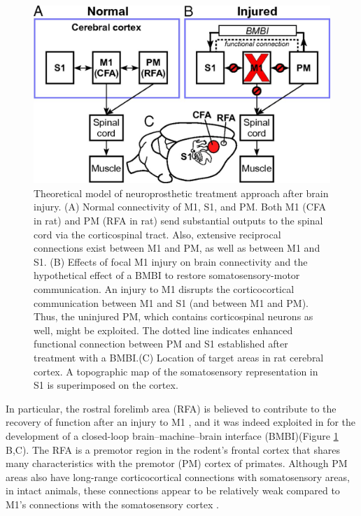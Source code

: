 \begin{figure}[ht!]
    \begin{center}
    \includegraphics[width=0.9\linewidth]{Figure/Brain-Machine-Brain Interface.jpeg}
    \end{center}
    \caption{\protect\cite{Guggenmos2013} Theoretical model of neuroprosthetic treatment approach after brain injury. (A) Normal connectivity of M1, S1, and PM. Both M1 (CFA in rat) and PM (RFA in rat) send substantial outputs to the spinal cord via the corticospinal tract. Also, extensive reciprocal connections exist between M1 and PM, as well as between M1 and S1. (B) Effects of focal M1 injury on brain connectivity and the hypothetical effect of a BMBI to restore somatosensory-motor communication. An injury to M1 disrupts the corticocortical communication between M1 and S1 (and between M1 and PM). Thus, the uninjured PM, which contains corticospinal neurons as well, might be exploited. The dotted line indicates enhanced functional connection between PM and S1 established after treatment with a BMBI.(C) Location of target areas in rat cerebral cortex. A topographic map of the somatosensory representation in S1 is superimposed on the cortex.}
    \label{fig:Brain-Machine-Brain Interface}
\end{figure}

In particular, the rostral forelimb area (RFA) is believed to contribute to the recovery of function after an injury to M1 \cite{Nishibe2010,Conner2005,Rouiller1993}, and it was indeed exploited in \cite{Guggenmos2013} for the development of a closed-loop brain–machine–brain interface (BMBI)(Figure \ref{fig:Brain-Machine-Brain Interface} B,C). The RFA is a premotor region in the rodent's frontal cortex that shares many characteristics with the premotor (PM) cortex of primates. Although PM areas also have long-range corticocortical connections with somatosensory areas, in intact animals, these connections appear to be relatively weak compared to M1's connections with the somatosensory cortex \cite{Rouiller1993,Dancause2005,Fang2005}.

